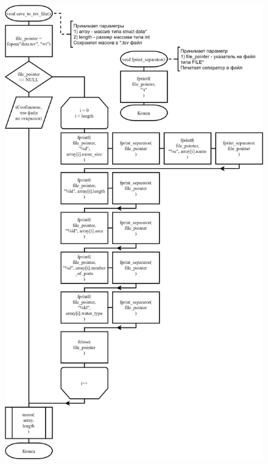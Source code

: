 \begin{figure}[!htp]
    \includegraphics[height=25cm]{../../Makefile-project/src/menu/save_to_tsv_file/save_to_tsv_file.png}
\end{figure}

